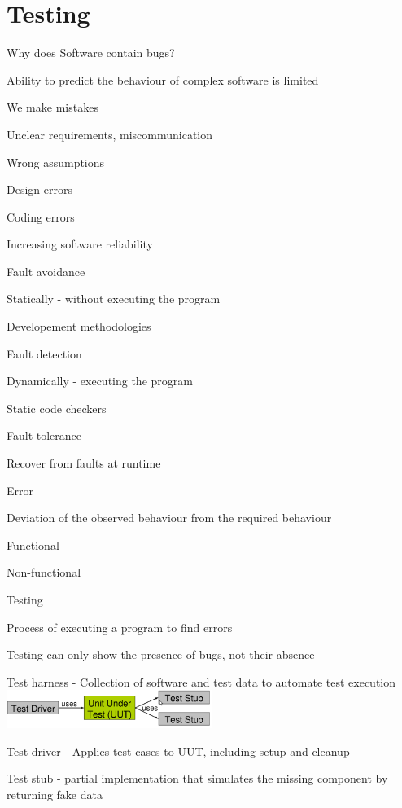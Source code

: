 \section{Testing}
\enumstart
	\item Why does Software contain bugs?
	\enumstart
		\item Ability to predict the behaviour of complex software is limited
		\item We make mistakes
		\enumstart
			\item Unclear requirements, miscommunication
			\item Wrong assumptions
			\item Design errors
			\item Coding errors
		\enumend
	\enumend
	\item Increasing software reliability
	\enumstart
		\item Fault avoidance
		\enumstart
			\item Statically - without executing the program
			\item Developement methodologies
		\enumend
		\item Fault detection
		\enumstart
			\item Dynamically - executing the program
			\item Static code checkers
		\enumend
		\item Fault tolerance
		\enumstart
			\item Recover from faults at runtime
		\enumend
	\enumend
	\item Error
	\enumstart
		\item Deviation of the observed behaviour from the required behaviour
		\item Functional
		\item Non-functional
	\enumend
	\item Testing
	\enumstart
		\item Process of executing a program to find errors
		\item Testing can only show the presence of bugs, not their absence
	\enumend
	\item Test harness - Collection of software and test data to automate test execution
	\\ \includegraphics[width=0.5\textwidth]{img/test_harness.png}
	\enumstart
		\item Test driver - Applies test cases to UUT, including setup and cleanup
		\item Test stub - partial implementation that simulates the missing component by returning fake data
	\enumend
\enumend

